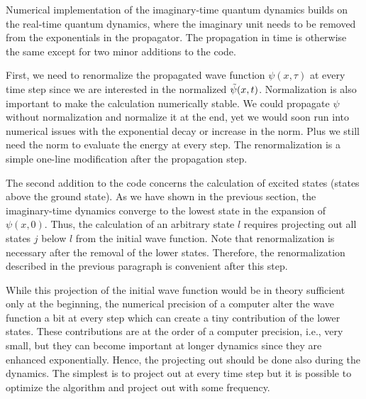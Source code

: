 Numerical implementation of the imaginary-time quantum dynamics builds on the real-time quantum dynamics, where the imaginary unit needs to be removed from the exponentials in the propagator. The propagation in time is otherwise the same except for two minor additions to the code.

First, we need to renormalize the propagated wave function $\psi(x,\tau)$ at every time step since we are interested in the normalized $\Tilde{\psi}(x,t)$. Normalization is also important to make the calculation numerically stable. We could propagate $\psi$ without normalization and normalize it at the end, yet we would soon run into numerical issues with the exponential decay or increase in the norm. Plus we still need the norm to evaluate the energy at every step. The renormalization is a simple one-line modification after the propagation step.

The second addition to the code concerns the calculation of excited states (states above the ground state). As we have shown in the previous section, the imaginary-time dynamics converge to the lowest state in the expansion of $\psi(x,0)$. Thus, the calculation of an arbitrary state $l$ requires projecting out all states $j$ below $l$ from the initial wave function. Note that renormalization is necessary after the removal of the lower states. Therefore, the renormalization described in the previous paragraph is convenient after this step. 

While this projection of the initial wave function would be in theory sufficient only at the beginning, the numerical precision of a computer alter the wave function a bit at every step which can create a tiny contribution of the lower states. These contributions are at the order of a computer precision, i.e., very small, but they can become important at longer dynamics since they are enhanced exponentially. Hence, the projecting out should be done also during the dynamics. The simplest is to project out at every time step but it is possible to optimize the algorithm and project out with some frequency.


